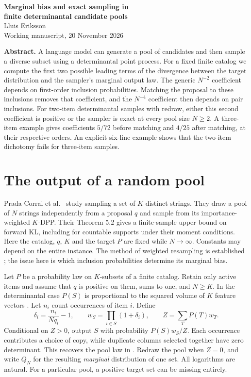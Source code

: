 \documentclass[11pt]{article}
\begin{document}
\begin{center}{\LARGE\bfseries Marginal bias and exact sampling in\\[3pt] finite determinantal candidate pools}\\[7pt]
Lluis Eriksson\\[2pt]\small Working manuscript, 20 November 2026\end{center}
\textbf{Abstract.} A language model can generate a pool of candidates and then sample a diverse subset using a determinantal point process. For a fixed finite catalog we compute the first two possible leading terms of the divergence between the target distribution and the sampler's marginal output law. The generic $N^{-2}$ coefficient depends on first-order inclusion probabilities. Matching the proposal to these inclusions removes that coefficient, and the $N^{-4}$ coefficient then depends on pair inclusions. For two-item determinantal samples with redraw, either this second coefficient is positive or the sampler is exact at every pool size $N\ge2$. A three-item example gives coefficients $5/72$ before matching and $4/25$ after matching, at their respective orders. An explicit six-line example shows that the two-item dichotomy fails for three-item samples.

\section{The output of a random pool}
Prada-Corral et al.\ \cite{pool} study sampling a set of $K$ distinct strings. They draw a pool of $N$ strings independently from a proposal $q$ and sample from its importance-weighted $K$-DPP. Their Theorem 5.2 gives a finite-sample upper bound on forward KL, including for countable supports under their moment conditions. Here the catalog, $q$, $K$ and the target $P$ are fixed while $N\to\infty$. Constants may depend on the entire instance. The method of weighted resampling is established \cite{kviman}; the issue here is which inclusion probabilities determine its marginal bias.

Let $P$ be a probability law on $K$-subsets of a finite catalog. Retain only active items and assume that $q$ is positive on them, sums to one, and $N\ge K$. In the determinantal case $P(S)$ is proportional to the squared volume of $K$ feature vectors \cite{kt}. Let $n_i$ count occurrences of item $i$. Define
\[
 \delta_i=\frac{n_i}{Nq_i}-1,\qquad
 w_S=\prod_{i\in S}(1+\delta_i),\qquad Z=\sum_T P(T)w_T.
\]
Conditional on $Z>0$, output $S$ with probability $P(S)w_S/Z$. Each occurrence contributes a choice of copy, while duplicate columns selected together have zero determinant. This recovers the pool law in \cite{pool}. Redraw the pool when $Z=0$, and write $Q_N$ for the resulting \emph{marginal} distribution of one set. All logarithms are natural. For a particular pool, a positive target set can be missing entirely.
\end{document}
